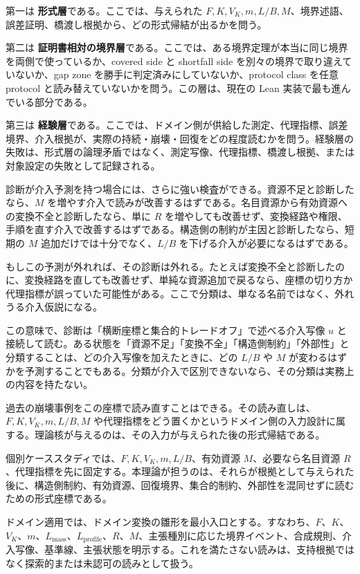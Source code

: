 \documentclass[12pt,a4paper]{article}
\begin{document}
第一は \textbf{形式層}である。ここでは、与えられた \(F,K,V_K,m,L/B,M\)、境界述語、誤差証明、橋渡し根拠から、どの形式帰結が出るかを問う。

第二は \textbf{証明書相対の境界層}である。ここでは、ある境界定理が本当に同じ境界を両側で使っているか、covered side と shortfall side を別々の境界で取り違えていないか、gap zone を勝手に判定済みにしていないか、protocol class を任意 protocol と読み替えていないかを問う。この層は、現在の Lean 実装で最も進んでいる部分である。

第三は \textbf{経験層}である。ここでは、ドメイン側が供給した測定、代理指標、誤差境界、介入根拠が、実際の持続・崩壊・回復をどの程度読むかを問う。経験層の失敗は、形式層の論理矛盾ではなく、測定写像、代理指標、橋渡し根拠、または対象設定の失敗として記録される。

診断が介入予測を持つ場合には、さらに強い検査ができる。資源不足と診断したなら、\(M\) を増やす介入で読みが改善するはずである。名目資源から有効資源への変換不全と診断したなら、単に \(R\) を増やしても改善せず、変換経路や権限、手順を直す介入で改善するはずである。構造側の制約が主因と診断したなら、短期の \(M\) 追加だけでは十分でなく、\(L/B\) を下げる介入が必要になるはずである。

もしこの予測が外れれば、その診断は外れる。たとえば変換不全と診断したのに、変換経路を直しても改善せず、単純な資源追加で戻るなら、座標の切り方か代理指標が誤っていた可能性がある。ここで分類は、単なる名前ではなく、外れうる介入仮説になる。

この意味で、診断は「横断座標と集合的トレードオフ」で述べる介入写像 \(u\) と接続して読む。ある状態を「資源不足」「変換不全」「構造側制約」「外部性」と分類することは、どの介入写像を加えたときに、どの \(L/B\) や \(M\) が変わるはずかを予測することでもある。分類が介入で区別できないなら、その分類は実務上の内容を持たない。

過去の崩壊事例をこの座標で読み直すことはできる。その読み直しは、\(F,K,V_K,m,L/B,M\) や代理指標をどう置くかというドメイン側の入力設計に属する。理論核が与えるのは、その入力が与えられた後の形式帰結である。

個別ケーススタディでは、\(F,K,V_K,m,L/B\)、有効資源 \(M\)、必要なら名目資源 \(R\)、代理指標を先に固定する。本理論が担うのは、それらが根拠として与えられた後に、構造側制約、有効資源、回復境界、集合的制約、外部性を混同せずに読むための形式座標である。

ドメイン適用では、ドメイン変換の雛形を最小入口とする。すなわち、\(F\)、\(K\)、\(V_K\)、\(m\)、\(L_{\mathrm{mass}}\)、\(L_{\mathrm{profile}}\)、\(R\)、\(M\)、主張種別に応じた境界イベント、合成規則、介入写像、基準線、主張状態を明示する。これを満たさない読みは、支持根拠ではなく探索的または未認可の読みとして扱う。
\end{document}
